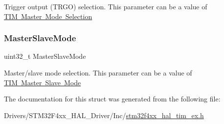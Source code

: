 Trigger output (T\+R\+GO) selection. This parameter can be a value of \mbox{\hyperlink{group___t_i_m___master___mode___selection}{T\+IM Master Mode Selection}} \mbox{\label{struct_t_i_m___master_config_type_def_aa17903ecbee15ce7a6d51de5e9602d3f}} 
\subsubsection{\texorpdfstring{Master\+Slave\+Mode}{MasterSlaveMode}}
{\footnotesize\ttfamily uint32\+\_\+t Master\+Slave\+Mode}

Master/slave mode selection. This parameter can be a value of \mbox{\hyperlink{group___t_i_m___master___slave___mode}{T\+IM Master Slave Mode}} 

The documentation for this struct was generated from the following file\+:\begin{DoxyCompactItemize}
\item 
Drivers/\+S\+T\+M32\+F4xx\+\_\+\+H\+A\+L\+\_\+\+Driver/\+Inc/\mbox{\hyperlink{stm32f4xx__hal__tim__ex_8h}{stm32f4xx\+\_\+hal\+\_\+tim\+\_\+ex.\+h}}\end{DoxyCompactItemize}
